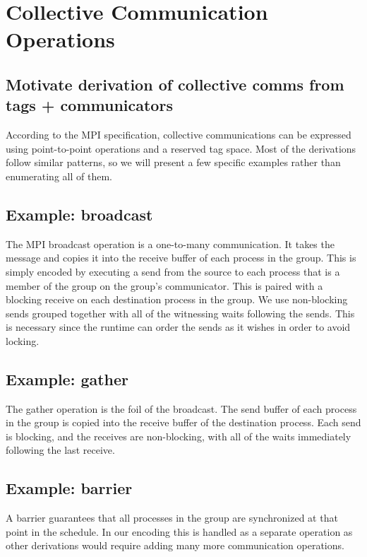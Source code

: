 \section{Collective Communication Operations}

\subsection{Motivate derivation of collective comms from tags + communicators}
According to the MPI specification, collective communications can be expressed
using point-to-point operations and a reserved tag space. Most of the
derivations follow similar patterns, so we will present a few specific examples
rather than enumerating all of them.

\subsection{Example: broadcast}
The MPI broadcast operation is a one-to-many communication. It takes the message
and copies it into the receive buffer of each process in the group. This is
simply encoded by executing a send from the source to each process that is a
member of the group on the group's communicator. This is paired with a blocking
receive on each destination process in the group. We use non-blocking sends
grouped together with all of the witnessing waits following the sends. This is
necessary since the runtime can order the sends as it wishes in order to avoid
locking.

\subsection{Example: gather}
The gather operation is the foil of the broadcast. The send buffer of each
process in the group is copied into the receive buffer of the destination
process. Each send is blocking, and the receives are non-blocking, with all of
the waits immediately following the last receive.

\subsection{Example: barrier}
A barrier guarantees that all processes in the group are synchronized at that
point in the schedule. In our encoding this is handled as a separate operation
as other derivations would require adding many more communication operations.

